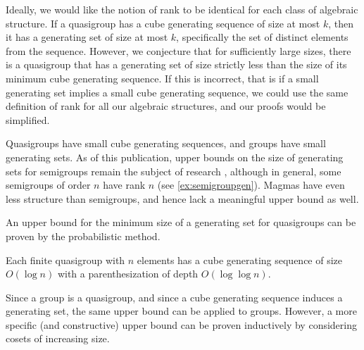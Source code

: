 \documentclass{article}
\newcommand{\todo}[1]{\textbf{TODO #1}}
\begin{document}

Ideally, we would like the notion of rank to be identical for each class of algebraic structure.
If a quasigroup has a cube generating sequence of size at most $k$, then it has a generating set of size at most $k$, specifically the set of distinct elements from the sequence.
However, we conjecture that for sufficiently large sizes, there is a quasigroup that has a generating set of size strictly less than the size of its minimum cube generating sequence.
If this is incorrect, that is if a small generating set implies a small cube generating sequence, we could use the same definition of rank for all our algebraic structures, and our proofs would be simplified.

Quasigroups have small cube generating sequences, and groups have small generating sets.
As of this publication, upper bounds on the size of generating sets for semigroups remain the subject of research \autocite{gray14}, although in general, some semigroups of order $n$ have rank $n$ (see \autoref{ex:semigroupgen}).
Magmas have even less structure than semigroups, and hence lack a meaningful upper bound as well.

An upper bound for the minimum size of a generating set for quasigroups can be proven by the probabilistic method.

\begin{lemma}\label{lem:small}
  Each finite quasigroup with $n$ elements has a cube generating sequence of size $O(\log n)$ with a parenthesization of depth $O(\log \log n)$.
\end{lemma}

Since a group is a quasigroup, and since a cube generating sequence induces a generating set, the same upper bound can be applied to groups.
However, a more specific (and constructive) upper bound can be proven inductively by considering cosets of increasing size.
\end{document}
